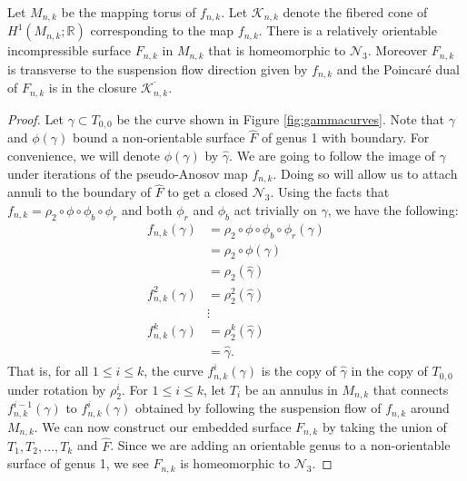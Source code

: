 \begin{lem}
\label{lem:genus3}
Let $M_{n,k}$ be the mapping torus of $f_{n,k}$. Let $\mathcal{K}_{n,k}$ denote the fibered cone of
$H^1(M_{n,k};\mathbb{R})$ corresponding to the map $f_{n,k}$. 
There is a relatively orientable incompressible surface $F_{n,k}$ in $M_{n,k}$ that is homeomorphic to $\mathcal{N}_3$.
Moreover $F_{n,k}$ is transverse to the suspension flow direction given by $f_{n,k}$ and the Poincar\'e dual of $F_{n,k}$ is in
the closure $\overline{\mathcal{K}_{n,k}}$.
\end{lem}
\begin{proof}
  Let $\gamma \subset T_{0,0}$ be the curve shown in Figure \ref{fig:gammacurves}. Note that $\gamma$ and $\phi(\gamma)$ bound a non-orientable surface
  $\hat{F}$ of genus 1 with boundary. For convenience, we will denote $\phi(\gamma)$ by $\widehat{\gamma}$. We are going to follow the image of $\gamma$
  under iterations of the pseudo-Anosov map $f_{n,k}$.  Doing so will allow us to attach annuli to the
  boundary of $\widehat{F}$ to get a closed $\mathcal{N}_3$. Using the facts that $f_{n,k}=\rho_2\circ\phi\circ\phi_b\circ\phi_r$ and both $\phi_r$ and $\phi_b$ act trivially on $\gamma$, we have the following:
  \begin{align*}
    f_{n,k}(\gamma) &= \rho_2 \circ \phi \circ \phi_b \circ \phi_r(\gamma) \\
                    &= \rho_2 \circ \phi(\gamma) \\
                    &= \rho_2(\widehat{\gamma}) \\
    f^2_{n,k}(\gamma) &= \rho_2^2(\widehat{\gamma}) \\
                      &\vdots \\
    f^k_{n,k}(\gamma) &= \rho_2^k(\widehat{\gamma})\\
                      &= \widehat{\gamma}.
  \end{align*}
  That is, for all $1\leq i\leq k$, the curve $f_{n,k}^i(\gamma)$ is the copy of $\widehat{\gamma}$ in the copy of $T_{0,0}$ under rotation by $\rho_2^i$.  
  For $1\leq i\leq k$, let $T_i$ be an annulus in $M_{n,k}$ that connects $f_{n,k}^{i-1}(\gamma)$ to $f_{n,k}^i(\gamma)$ obtained by following the suspension
  flow of $f_{n,k}$ around $M_{n,k}$. We can now construct our embedded surface $F_{n,k}$ by taking the union of
  $T_1,T_2,\dots,T_k$ and $\hat{F}$. Since we are adding an orientable genus to a non-orientable surface of
  genus 1, we see $F_{n,k}$ is homeomorphic to $\mathcal{N}_3$.


\end{proof}
